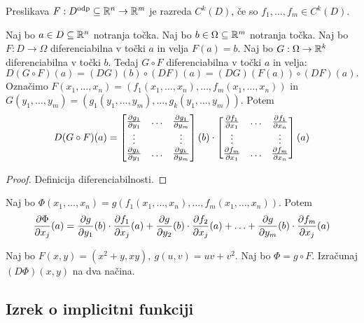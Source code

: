 \begin{definicija}
    Preslikava $F: D^{\text{odp}} \subseteq \mathbb{R}^n \to \mathbb{R}^m$ je razreda $C^k(D)$, če so $f_1, \ldots, f_m \in C^k(D)$.
\end{definicija}

\begin{izrek}
    Naj bo $a \in D \subseteq \mathbb{R}^n$ notranja točka. Naj bo $b \in \Omega \subseteq \mathbb{R}^m$ notranja točka. Naj bo $F: D \to \Omega$ diferenciabilna v točki $a$ in velja $F(a) = b$. Naj bo $G: \Omega \to \mathbb{R}^k$ diferenciabilna v točki $b$. Tedaj $G \circ F$ diferenciabilna v točki $a$ in velja:
    $$D(G \circ F)(a) = (DG)(b) \circ (DF)(a) = (DG)(F(a)) \circ (DF)(a).$$
    Označimo $F(x_1, \ldots, x_n) = (f_1(x_1, \ldots, x_n), \ldots, f_m(x_1, \ldots, x_n))$ in $G(y_1, \ldots, y_m) = (g_1(y_1, \ldots, y_m), \ldots, g_k(y_1, \ldots, y_m))$. Potem 
    $$D(G \circ F)(a) = \begin{bmatrix}
        \frac{\partial g_1}{\partial y_1} & \ldots & \frac{\partial g_1}{\partial y_m} \\
        \vdots & & \vdots \\
        \frac{\partial g_k}{\partial y_1} & \ldots & \frac{\partial g_k}{\partial y_m}
    \end{bmatrix}(b) \cdot \begin{bmatrix}
        \frac{\partial f_1}{\partial x_1} & \ldots & \frac{\partial f_1}{\partial x_n} \\
        \vdots & & \vdots \\
        \frac{\partial f_m}{\partial x_1} & \ldots & \frac{\partial f_m}{\partial x_n}
    \end{bmatrix}(a)$$
\end{izrek}

\begin{proof}
    Definicija diferenciabilnosti.
\end{proof}

\begin{posledica}[$k=1$, $G = g$ funkcija]
    Naj bo $\Phi(x_1, \ldots, x_n) = g(f_1(x_1, \ldots, x_n), \ldots, f_m(x_1, \ldots, x_n))$. Potem 
    $$\frac{\partial \Phi}{\partial x_j}(a) = \frac{\partial g}{\partial y_1}(b) \cdot \frac{\partial f_1}{\partial x_j}(a) + \frac{\partial g}{\partial y_2}(b) \cdot \frac{\partial f_2}{\partial x_j}(a) + \ldots + \frac{\partial g}{\partial y_m}(b) \cdot \frac{\partial f_m}{\partial x_j}(a)$$
\end{posledica}

\begin{zgled}
    Naj bo $F(x,y) = (x^2 + y, xy), \ g(u, v) = uv + v^2$. Naj bo $\Phi = g \circ F$. Izračunaj $(D\Phi)(x,y)$ na dva načina.
\end{zgled}

\newpage
\subsection{Izrek o implicitni funkciji}

